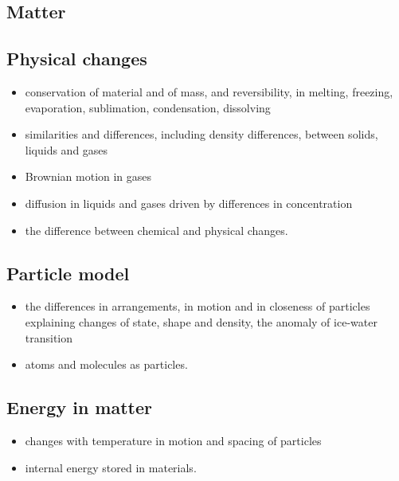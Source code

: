\documentclass[10pt]{article}
\begin{document}
\begin{paracol}{2}
\switchcolumn*

\section{Matter}
\subsection{Physical changes}
\begin{itemize}
\item conservation of material and of mass, and reversibility, in melting, freezing,
evaporation, sublimation, condensation, dissolving
\item similarities and differences, including density differences, between solids, liquids and
gases
\item Brownian motion in gases
\item diffusion in liquids and gases driven by differences in concentration
\item the difference between chemical and physical changes.
\end{itemize}
\subsection{Particle model}
\begin{itemize}
\item the differences in arrangements, in motion and in closeness of particles explaining
changes of state, shape and density, the anomaly of ice-water transition
\item atoms and molecules as particles.
\end{itemize}
\subsection{Energy in matter}
\begin{itemize}
\item changes with temperature in motion and spacing of particles
\item internal energy stored in materials.
\end{itemize}

\switchcolumn


\begin{enumerate}

\end{enumerate}
\end{paracol}
\end{document}
